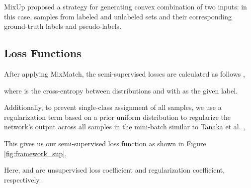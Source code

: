 \documentclass[10pt,twocolumn,letterpaper]{article}
\begin{document}
MixUp \cite{zhang2018mixup} proposed a strategy for generating convex combination of two inputs: in this case, samples from labeled and unlabeled sets and their corresponding ground-truth labels and pseudo-labels.

\subsection{Loss Functions}
After applying MixMatch, the semi-supervised losses are calculated as follows \cite{berthelot2019mixmatch}, 

where  is the cross-entropy between distributions  and  with  as the given label.  

Additionally, to prevent single-class assignment of all samples, we use  a regularization term based on a prior uniform distribution  to regularize the network's output across all samples in the mini-batch similar to Tanaka et al. \cite{tanaka2018joint} ,

This gives us our semi-supervised loss function as shown in Figure \ref{fig:framework_sup},

Here,  and  are unsupervised loss coefficient and regularization coefficient, respectively.

\begin{table*}[htb]
\centering
{}

\caption{Contribution of different loss functions on the performance of \textsc{UniCon}. While removing each loss term decreases the test accuracy,  plays the most important role in obtaining SOTA performance. Test accuracies from the last epoch are also shown.}
\label{tab:loss_impact}
\end{table*}
\end{document}
